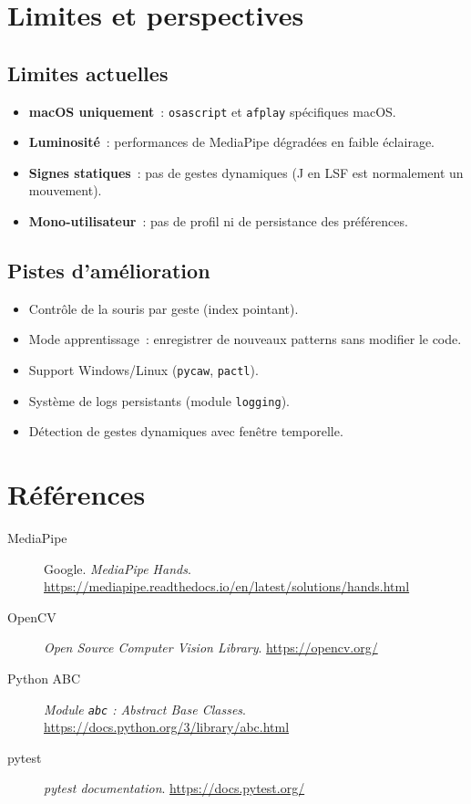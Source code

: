 \documentclass[12pt,a4paper]{article}
\begin{document}
\section{Limites et perspectives}
\label{sec:limites}

\subsection{Limites actuelles}
\begin{itemize}
  \item \textbf{macOS uniquement}~: \texttt{osascript} et \texttt{afplay} sp\'ecifiques macOS.
  \item \textbf{Luminosit\'e}~: performances de MediaPipe d\'egrad\'ees en faible \'eclairage.
  \item \textbf{Signes statiques}~: pas de gestes dynamiques (J en LSF est normalement un mouvement).
  \item \textbf{Mono-utilisateur}~: pas de profil ni de persistance des pr\'ef\'erences.
\end{itemize}

\subsection{Pistes d'am\'elioration}
\begin{itemize}
  \item Contr\^ole de la souris par geste (index pointant).
  \item Mode apprentissage~: enregistrer de nouveaux patterns sans modifier le code.
  \item Support Windows/Linux (\texttt{pycaw}, \texttt{pactl}).
  \item Syst\`eme de logs persistants (module \texttt{logging}).
  \item D\'etection de gestes dynamiques avec fen\^etre temporelle.
\end{itemize}

\newpage

\section*{R\'ef\'erences}

\begin{description}
  \item[MediaPipe] Google. \textit{MediaPipe Hands}.
    \url{https://mediapipe.readthedocs.io/en/latest/solutions/hands.html}
  \item[OpenCV] \textit{Open Source Computer Vision Library}.
    \url{https://opencv.org/}
  \item[Python ABC] \textit{Module \texttt{abc} : Abstract Base Classes}.
    \url{https://docs.python.org/3/library/abc.html}
  \item[pytest] \textit{pytest documentation}.
    \url{https://docs.pytest.org/}
\end{description}
\end{document}
